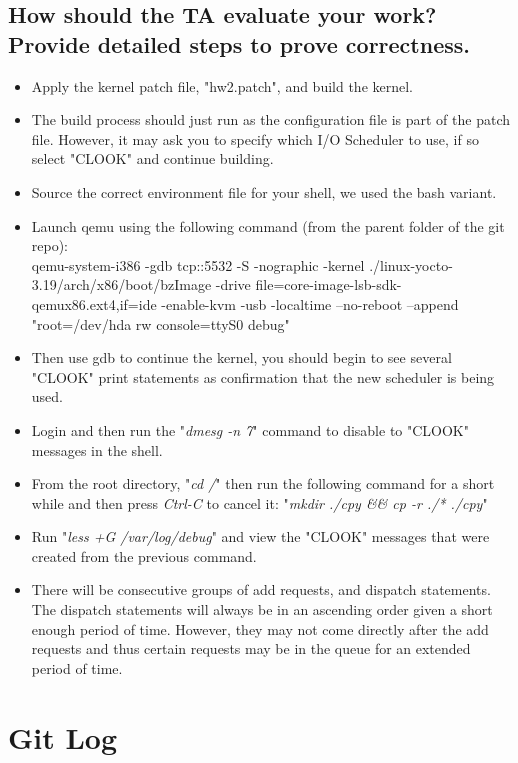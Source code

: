 \documentclass[onecolumn, draftclsnofoot,10pt, compsoc]{IEEEtran}
\begin{document}
\subsection{How should the TA evaluate your work? Provide detailed steps to prove correctness.}

\begin{itemize}
		\item Apply the kernel patch file, "hw2.patch", and build the kernel.
		\item The build process should just run as the configuration file is part of the patch file.  However, it may ask you to specify which I/O Scheduler to use, if so select "CLOOK" and continue building.
		\item Source the correct environment file for your shell, we used the bash variant.
		\item Launch qemu using the following command (from the parent folder of the git repo):\\
		qemu-system-i386 -gdb tcp::5532 -S -nographic -kernel ./linux-yocto-3.19/arch/x86/boot/bzImage -drive file=core-image-lsb-sdk-qemux86.ext4,if=ide -enable-kvm -usb -localtime --no-reboot --append "root=/dev/hda rw console=ttyS0 debug"
		\item Then use gdb to continue the kernel, you should begin to see several "CLOOK" print statements as confirmation that the new scheduler is being used.
		\item Login and then run the "\textit{dmesg -n 7}" command to disable to "CLOOK" messages in the shell.
		\item From the root directory, "\textit{cd /}" then run the following command for a short while and then press \textit{Ctrl-C} to cancel it: "\textit{mkdir ./cpy \&\& cp -r ./* ./cpy}"
		\item Run "\textit{less +G /var/log/debug}" and view the "CLOOK" messages that were created from the previous command.
		\item There will be consecutive groups of add requests, and dispatch statements.  The dispatch statements will always be in an ascending order given a short enough period of time.  However, they may not come directly after the add requests and thus certain requests may be in the queue for an extended period of time.
\end{itemize}

\section{Git Log}
\end{document}
